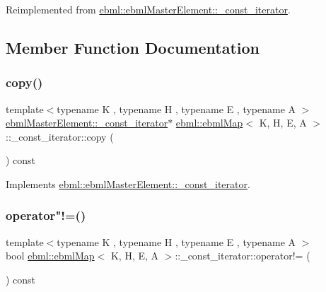 Reimplemented from \mbox{\hyperlink{classebml_1_1ebmlMasterElement_1_1__const__iterator_a6138f42b88ff06379d96a095a12ed136}{ebml\+::ebml\+Master\+Element\+::\+\_\+const\+\_\+iterator}}.



\subsection{Member Function Documentation}
\mbox{\label{classebml_1_1ebmlMap_1_1__const__iterator_af2bd75417ff0115d8bb53670ff8deaf2}} 
\subsubsection{\texorpdfstring{copy()}{copy()}}
{\footnotesize\ttfamily template$<$typename K , typename H , typename E , typename A $>$ \\
\mbox{\hyperlink{classebml_1_1ebmlMasterElement_1_1__const__iterator}{ebml\+Master\+Element\+::\+\_\+const\+\_\+iterator}}$\ast$ \mbox{\hyperlink{classebml_1_1ebmlMap}{ebml\+::ebml\+Map}}$<$ K, H, E, A $>$\+::\+\_\+const\+\_\+iterator\+::copy (\begin{DoxyParamCaption}{ }\end{DoxyParamCaption}) const\hspace{0.3cm}{\ttfamily [virtual]}}



Implements \mbox{\hyperlink{classebml_1_1ebmlMasterElement_1_1__const__iterator_a64a4853ad363358987eb6492579cd503}{ebml\+::ebml\+Master\+Element\+::\+\_\+const\+\_\+iterator}}.

\mbox{\label{classebml_1_1ebmlMap_1_1__const__iterator_aa63b9e3fd20c1092792db91a25fb2b70}} 
\subsubsection{\texorpdfstring{operator"!=()}{operator!=()}}
{\footnotesize\ttfamily template$<$typename K , typename H , typename E , typename A $>$ \\
bool \mbox{\hyperlink{classebml_1_1ebmlMap}{ebml\+::ebml\+Map}}$<$ K, H, E, A $>$\+::\+\_\+const\+\_\+iterator\+::operator!= (\begin{DoxyParamCaption}\item[{const \mbox{\hyperlink{classebml_1_1ebmlMasterElement_1_1__const__iterator}{ebml\+Master\+Element\+::\+\_\+const\+\_\+iterator}} \&}]{ }\end{DoxyParamCaption}) const\hspace{0.3cm}{\ttfamily [virtual]}}



